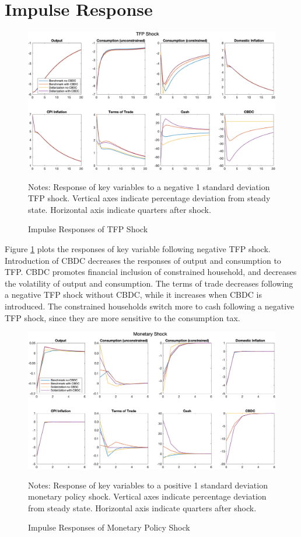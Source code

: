 \documentclass[12pt]{article}
\begin{document}
\clearpage
\section{Impulse Response}

\begin{figure}[h!]
\label{IRF1}
\includegraphics[width=\textwidth]{TFP}
\caption{Impulse Responses of TFP Shock}
\scriptsize{Notes: Response of key variables to a negative 1 standard deviation TFP shock. Vertical axes indicate percentage deviation from steady state. Horizontal axis indicate quarters after shock. }
\end{figure}
Figure \ref{IRF1} plots the responses of key variable following negative TFP shock. Introduction of CBDC decreases the responses of output and consumption to TFP. CBDC promotes financial inclusion of constrained household, and decreases the volatility of output and consumption. The terms of trade decreases following a negative TFP shock without CBDC, while it increases when CBDC is introduced. The constrained households switch more to cash following a negative TFP shock, since they are more sensitive to the consumption tax. 

\begin{figure}[h!]
\label{IRF2}
\includegraphics[width=\textwidth]{Monetary}
\caption{Impulse Responses of Monetary Policy Shock}
\scriptsize{Notes: Response of key variables to a positive 1 standard deviation monetary policy shock. Vertical axes indicate percentage deviation from steady state. Horizontal axis indicate quarters after shock. }
\end{figure}
\end{document}
